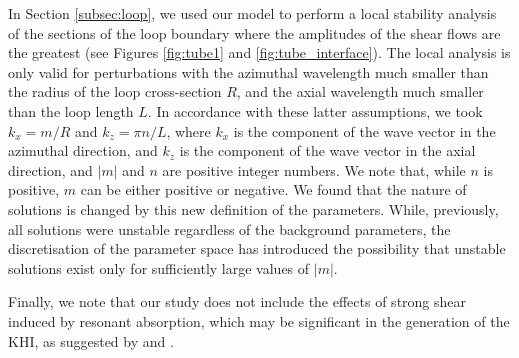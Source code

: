 \documentclass[12pt]{ociamthesis}
\begin{document}
In Section \ref{subsec:loop}, we used our model to perform a local stability analysis of the sections of the loop boundary where the amplitudes of the shear flows are the greatest (see Figures \ref{fig:tube1} and \ref{fig:tube_interface}).
The local analysis is only valid for perturbations with the azimuthal wavelength much smaller than the radius of the loop cross-section $R$, and the axial wavelength much smaller than the loop length $L$\/.
In accordance with these latter assumptions, we took $k_x = m/R$ and $k_z = \pi n/L$, where $k_x$ is the component of the wave vector in the azimuthal direction, and $k_z$ is the component of the wave vector in the axial direction, and $|m|$ and $n$ are positive integer numbers.
We note that, while $n$ is positive, $m$ can be either positive or negative.
We found that the nature of solutions is changed by this new definition of the parameters.
While, previously, all solutions were unstable regardless of the background parameters, the discretisation of the parameter space has introduced the possibility that unstable solutions exist only for sufficiently large values of $|m|$.

Finally, we note that our study does not include the effects of strong shear induced by resonant absorption, which may be significant in the generation of the KHI, as suggested by \cite{Howson2017b} and \cite{Terradas2018}.



  
\end{document}
